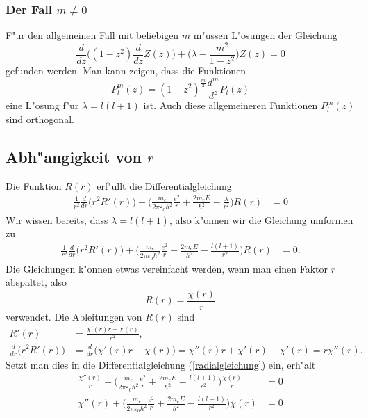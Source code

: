 \subsubsection{Der Fall $m\ne 0$}
F"ur den allgemeinen Fall mit beliebigen $m$ m"ussen L"osungen der
Gleichung
\begin{equation}
\frac{d}{dz}\biggl((1-z^2)\frac{d}{dz}Z(z)\biggr)
+\biggl(\lambda -\frac{m^2}{1-z^2}\biggr)Z(z)=0
\end{equation}
gefunden werden. Man kann zeigen, dass die Funktionen
\[
P_l^m(z)=
(1-z^2)^{\frac{m}2}\frac{d^m}{d^z}P_l(z)
\]
eine L"osung f"ur $\lambda=l(l+1)$ ist.
Auch diese allgemeineren Funktionen $P_l^m(z)$ sind orthogonal.

\subsection{Abh"angigkeit von $r$}
Die Funktion $R(r)$ erf"ullt die Differentialgleichung
\begin{align}
\frac{1}{r^2}\frac{d}{dr}\bigl(r^2R'(r)\bigr)
+\biggl(\frac{m_e}{2\pi\varepsilon_0\hbar^2}\frac{e^2}{r}
+
\frac{2m_eE}{\hbar^2}
-\frac{\lambda}{r^2}
\biggr)R(r)
&=0
\label{radialgleichung}
\end{align}
Wir wissen bereits, dass $\lambda=l(l+1)$, also k"onnen wir die
Gleichung umformen zu
\begin{align*}
\frac{1}{r^2}\frac{d}{dr}\bigl(r^2R'(r)\bigr)
+\biggl(\frac{m_e}{2\pi\varepsilon_0\hbar^2}\frac{e^2}{r}
+
\frac{2m_eE}{\hbar^2}
-\frac{l(l+1)}{r^2}
\biggr)R(r)
&=0.
\end{align*}
Die Gleichungen k"onnen etwas vereinfacht werden, wenn man einen
Faktor $r$ abspaltet, also 
\[
R(r)=\frac{\chi(r)}{r}
\]
verwendet.
Die Ableitungen von $R(r)$ sind
\begin{align*}
R'(r)&=\frac{\chi'(r)r-\chi(r)}{r^2},\\
\frac{d}{dr}\bigl(r^2R'(r)\bigr)
&=
\frac{d}{dr}\bigl(\chi'(r)r-\chi(r)\bigr)
=
\chi''(r)r+\chi'(r)-\chi'(r)=r\chi''(r).
\end{align*}
Setzt man dies in die Differentialgleichung (\ref{radialgleichung}) ein,
erh"alt
\begin{align*}
\frac{\chi''(r)}{r}
+\biggl(\frac{m_e}{2\pi\varepsilon_0\hbar^2}\frac{e^2}{r}
+
\frac{2m_eE}{\hbar^2}
-\frac{l(l+1)}{r^2}
\biggr)\frac{\chi(r)}{r}
&=0
\\
\chi''(r)
+\biggl(\frac{m_e}{2\pi\varepsilon_0\hbar^2}\frac{e^2}{r}
+
\frac{2m_eE}{\hbar^2}
-\frac{l(l+1)}{r^2}
\biggr)\chi(r)
&=0
\end{align*}


